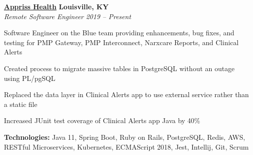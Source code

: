 %
    \headerrow
        {\textbf{\href{https://apprisshealth.com/}{Appriss Health}}}
        {\textbf{Louisville, KY}}
    \\
    \headerrow
        {\emph{Remote Software Engineer}}
        {\emph{2019 -- Present}}
    \begin{itemize*}
        \item Software Engineer on the Blue team providing enhancements, bug fixes, and testing for PMP Gateway,
            PMP Interconnect, Narxcare Reports, and Clinical Alerts
        \item Created process to migrate massive tables in PostgreSQL without an outage using PL/pgSQL
        \item Replaced the data layer in Clinical Alerts app to use external service rather than a static file
        \item Increased JUnit test coverage of Clinical Alerts app Java by 40\%
    \end{itemize*}

    \hspace{1.0em}
        {\textbf{Technologies:} Java 11, Spring Boot, Ruby on Rails, PostgreSQL, Redis, AWS,
        RESTful Microservices, Kubernetes, ECMAScript 2018, Jest, Intellij, Git, Scrum}

